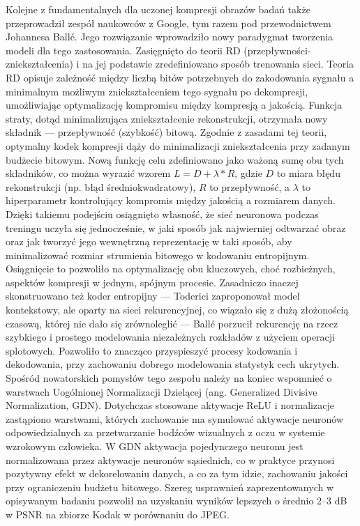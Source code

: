 Kolejne z fundamentalnych dla uczonej kompresji obrazów badań także przeprowadził zespół naukowców z Google, tym razem pod przewodnictwem Johannesa Ballé\cite{balle2017endtoendoptimizedimagecompression}. Jego rozwiązanie wprowadziło nowy paradygmat tworzenia modeli dla tego zastosowania. Zasięgnięto do teorii RD (przepływności-zniekształcenia) i na jej podstawie zredefiniowano sposób trenowania sieci. Teoria RD opisuje zależność między liczbą bitów potrzebnych do zakodowania sygnału a minimalnym możliwym zniekształceniem tego sygnału po dekompresji, umożliwiając optymalizację kompromisu między kompresją a jakością. Funkcja straty, dotąd minimalizująca zniekształcenie rekonstrukcji, otrzymała nowy składnik --- przepływność (szybkość) bitową. Zgodnie z zasadami tej teorii, optymalny kodek kompresji dąży do minimalizacji zniekształcenia przy zadanym budżecie bitowym. Nową funkcję celu zdefiniowano jako ważoną sumę obu tych składników, co można wyrazić wzorem \(L=D+\lambda*R\), gdzie \(D\) to miara błędu rekonstrukcji (np. błąd średniokwadratowy), $R$ to przepływność, a \(\lambda\) to hiperparametr kontrolujący kompromis między jakością a rozmiarem danych. Dzięki takiemu podejściu osiągnięto własność, że sieć neuronowa podczas treningu uczyła się jednocześnie, w jaki sposób jak najwierniej odtwarzać obraz oraz jak tworzyć jego wewnętrzną reprezentację w taki sposób, aby minimalizować rozmiar strumienia bitowego w kodowaniu entropijnym. Osiągnięcie to pozwoliło na optymalizację obu kluczowych, choć rozbieżnych, aspektów kompresji w jednym, spójnym procesie. Zasadniczo inaczej skonstruowano też koder entropijny --- Toderici zaproponował model kontekstowy, ale oparty na sieci rekurencyjnej, co wiązało się z dużą złożonością czasową, której nie dało się zrównoleglić --- Ballé porzucił rekurencję na rzecz szybkiego i prostego modelowania niezależnych rozkładów z użyciem operacji splotowych. Pozwoliło to znacząco przyspieszyć procesy kodowania i dekodowania, przy zachowaniu dobrego modelowania statystyk cech ukrytych. Spośród nowatorskich pomysłów tego zespołu należy na koniec wspomnieć o warstwach Uogólnionej Normalizacji Dzielącej (ang. Generalized Divisive Normalization, GDN). Dotychczas stosowane aktywacje ReLU i normalizacje zastąpiono warstwami, których zachowanie ma symulować aktywacje neuronów odpowiedzialnych za  przetwarzanie bodźców wizualnych z oczu w systemie wzrokowym człowieka. W GDN aktywacja pojedynczego neuronu jest normalizowana przez aktywacje neuronów sąsiednich, co w praktyce przynosi pozytywny efekt w dekorelowaniu danych, a co za tym idzie, zachowaniu jakości przy ograniczeniu budżetu bitowego. Szereg usprawnień zaprezentowanych w opisywanym badaniu pozwolił na uzyskaniu wyników lepszych o średnio 2--3 dB w PSNR na zbiorze Kodak w porównaniu do JPEG.


